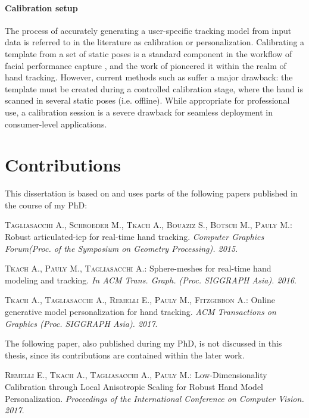 \paragraph{Calibration setup} The process of accurately generating a user-specific tracking model from input data is referred to in the literature as calibration or personalization. Calibrating a template from a set of static poses is a standard component in the workflow of facial performance capture \cite{weise2011realtime,cao2015facial}, and the work of \cite{taylor2014user} pioneered it within the realm of hand tracking. However, current methods such as \cite{taylor2016joint} suffer a major drawback: the template must be created during a controlled calibration stage, where the hand is scanned in several static poses (i.e. offline). While appropriate for professional use, a calibration session is a severe drawback for seamless deployment in consumer-level applications. 


\section{Contributions}

This dissertation is based on and uses parts of the following papers published in
the course of my PhD:

\begin{adjustwidth}{2.5em}{0pt}
\textsc{Tagliasacchi A., Schroeder M., Tkach A., Bouaziz S., Botsch M., Pauly
M.}: Robust articulated-icp for real-time hand tracking. \textit{Computer Graphics
Forum(Proc. of the Symposium on Geometry Processing). 2015}.

\textsc{Tkach A., Pauly M., Tagliasacchi A.}: Sphere-meshes for real-time hand
modeling and tracking. \textit{In ACM Trans. Graph. (Proc. SIGGRAPH Asia). 2016}.

\textsc{Tkach A., Tagliasacchi A., Remelli E., Pauly M., Fitzgibbon A.}: Online generative model personalization for hand tracking. \textit{ACM Transactions on Graphics (Proc. SIGGRAPH Asia). 2017}.
\end{adjustwidth}

The following paper, also published during my PhD, is not discussed in this thesis, since its contributions are contained within the later work.

\begin{adjustwidth}{2.5em}{0pt}
\textsc{Remelli E., Tkach A., Tagliasacchi A., Pauly M.}: Low-Dimensionality Calibration through Local Anisotropic Scaling for Robust Hand Model Personalization. \textit{Proceedings of the International Conference on Computer Vision. 2017}.
\end{adjustwidth}

